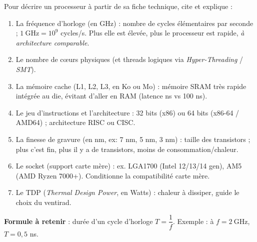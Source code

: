 \documentclass[11pt]{article}
\newcommand{\cle}[1]{{\popxbold\color{popdark}#1}}
\begin{document}
\begin{propriete}
Pour décrire un processeur à partir de sa fiche technique, cite et explique :
\begin{enumerate}
\item La \cle{fréquence d'horloge} (en GHz) : nombre de cycles élémentaires par seconde ; $1~\text{GHz} = 10^9$ cycles/s. Plus elle est élevée, plus le processeur est rapide, \emph{à architecture comparable}.
\item Le \cle{nombre de cœurs} physiques (et threads logiques via \emph{Hyper-Threading} / \emph{SMT}).
\item La mémoire \cle{cache} (L1, L2, L3, en Ko ou Mo) : mémoire SRAM très rapide intégrée au die, évitant d'aller en RAM (latence ns vs 100 ns).
\item Le \cle{jeu d'instructions} et l'architecture : 32 bits (x86) ou 64 bits (x86-64 / AMD64) ; architecture \cle{RISC} ou \cle{CISC}.
\item La \cle{finesse de gravure} (en nm, ex: 7 nm, 5 nm, 3 nm) : taille des transistors ; plus c'est fin, plus il y a de transistors, moins de consommation/chaleur.
\item Le \cle{socket} (support carte mère) : ex. LGA1700 (Intel 12/13/14 gen), AM5 (AMD Ryzen 7000+). Conditionne la compatibilité carte mère.
\item Le \cle{TDP} (\emph{Thermal Design Power}, en Watts) : chaleur à dissiper, guide le choix du ventirad.
\end{enumerate}
\textbf{Formule à retenir} : durée d'un cycle d'horloge $T = \dfrac{1}{f}$. Exemple : à $f = 2~\text{GHz}$, $T = 0,5$ ns.
\end{propriete}
\end{document}
